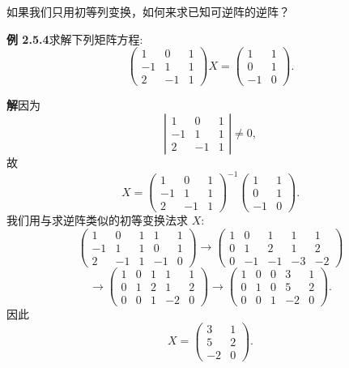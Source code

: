 \documentclass[UTF8, 12pt, fontset=fandol, oneside]{ctexart}
\begin{document}
如果我们只用初等列变换，如何来求已知可逆阵的逆阵？

\noindent\textbf{例 2.5.4}\quad 求解下列矩阵方程:
\[
\left(\begin{array}{rrr}
1 & 0 & 1\\
-1 & 1 & 1\\
2 & -1 & 1
\end{array}\right)X=
\left(\begin{array}{rr}
1 & 1\\
0 & 1\\
-1 & 0
\end{array}\right).
\]

\noindent\textbf{解}\quad 因为
\[
\left|\begin{array}{rrr}
1 & 0 & 1\\
-1 & 1 & 1\\
2 & -1 & 1
\end{array}\right|\ne 0,
\]
故
\[
X=
\left(\begin{array}{rrr}
1 & 0 & 1\\
-1 & 1 & 1\\
2 & -1 & 1
\end{array}\right)^{-1}
\left(\begin{array}{rr}
1 & 1\\
0 & 1\\
-1 & 0
\end{array}\right).
\]
我们用与求逆阵类似的初等变换法求 $X$:
\[
\left(\begin{array}{rrr|rr}
1 & 0 & 1 & 1 & 1\\
-1 & 1 & 1 & 0 & 1\\
2 & -1 & 1 & -1 & 0
\end{array}\right)
\longrightarrow
\left(\begin{array}{rrr|rr}
1 & 0 & 1 & 1 & 1\\
0 & 1 & 2 & 1 & 2\\
0 & -1 & -1 & -3 & -2
\end{array}\right)
\]
\[
\longrightarrow
\left(\begin{array}{rrr|rr}
1 & 0 & 1 & 1 & 1\\
0 & 1 & 2 & 1 & 2\\
0 & 0 & 1 & -2 & 0
\end{array}\right)
\longrightarrow
\left(\begin{array}{rrr|rr}
1 & 0 & 0 & 3 & 1\\
0 & 1 & 0 & 5 & 2\\
0 & 0 & 1 & -2 & 0
\end{array}\right).
\]
因此
\[
X=\left(\begin{array}{rr}
3 & 1\\
5 & 2\\
-2 & 0
\end{array}\right).
\]
\end{document}
